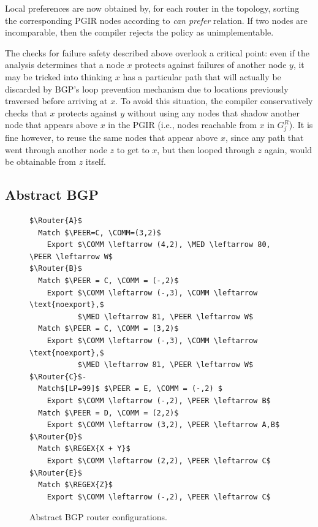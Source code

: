 Local preferences are now obtained by, for each router in the topology, sorting the corresponding PGIR nodes according to \textit{can prefer} relation. If two nodes are incomparable, then the compiler rejects the policy as unimplementable.


The checks for failure safety described above overlook a critical point: even if the analysis determines that a node $x$ protects against failures of another node $y$, it may be tricked into thinking $x$ has a particular path that will actually be discarded by BGP's loop prevention mechanism due to locations previously traversed before arriving at $x$. To avoid this situation, the compiler conservatively checks that $x$ protects against $y$ without using any nodes that shadow another node that appears above $x$ in the PGIR (i.e., nodes reachable from $x$ in $G_j^R$). It is fine however, to reuse the same nodes that appear above $x$, since any path that went through another node $z$ to get to $x$, but then looped through $z$ again, would be obtainable from $z$ itself.


\subsection{Abstract BGP}


\newcommand{\highlight}[1]{%
  \colorbox{red!50}{$\displaystyle#1$}}
\newcommand{\Router}[1]{ \textbf{Router #1:} }
\newcommand{\REGEX}[1]{ \text{regex}(#1) }
\newcommand{\PEER}{ \text{peer} }
\newcommand{\COMM} {\text{comm}}
\newcommand{\MED} {\text{MED}}

\begin{figure}[t!]
\begin{lstlisting}[frame=single, mathescape=true]
$\Router{A}$
  Match $\PEER=C, \COMM=(3,2)$
    Export $\COMM \leftarrow (4,2), \MED \leftarrow 80, \PEER \leftarrow W$
$\Router{B}$
  Match $\PEER = C, \COMM = (-,2)$
    Export $\COMM \leftarrow (-,3), \COMM \leftarrow \text{noexport},$
           $\MED \leftarrow 81, \PEER \leftarrow W$
  Match $\PEER = C, \COMM = (3,2)$
    Export $\COMM \leftarrow (-,3), \COMM \leftarrow \text{noexport},$
           $\MED \leftarrow 81, \PEER \leftarrow W$
$\Router{C}$-
  Match$[LP=99]$ $\PEER = E, \COMM = (-,2) $
    Export $\COMM \leftarrow (-,2), \PEER \leftarrow B$
  Match $\PEER = D, \COMM = (2,2)$
    Export $\COMM \leftarrow (3,2), \PEER \leftarrow A,B$
$\Router{D}$
  Match $\REGEX{X + Y}$
    Export $\COMM \leftarrow (2,2), \PEER \leftarrow C$
$\Router{E}$
  Match $\REGEX{Z}$
    Export $\COMM \leftarrow (-,2), \PEER \leftarrow C$
\end{lstlisting}
\label{fig:config}
\caption{Abstract BGP router configurations.}
\end{figure}


